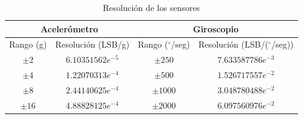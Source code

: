 \documentclass[12pt,a4paper]{article}
\newcommand{\grad}{$^{\circ}$}
\begin{document}
\begin{itemize}
		\begin{table}[H]
			\centering
			\label{table:resolucionSensor}
			\begin{tabular}{|c|c|c|c|}
				\hline
				\multicolumn{2}{|c|}{Acelerómetro} &\multicolumn{2}{|c|}{Giroscopio}   \\
				\hline
				Rango (g)        & Resolución (LSB/g)  & Rango (\grad/seg)     &  Resolución (LSB/(\grad/seg))\\ \hline
				$\pm 2$     &  $6.10351562e^{-5}$   &$\pm 250 $ 	& 	$7.633587786e^{-3}$ 	\\ 
				$\pm 4$     &  $1.22070313e^{-4}$  	&$\pm 500 $ 	& 	$1.526717557e^{-2}$    	\\
				$\pm 8$     &  $2.44140625e^{-4}$ 	& $\pm 1000$  	& 	$3.048780488e^{-2}$		\\
				$\pm 16$    &  $4.88828125e^{-4}$   & $\pm 2000$    & 	$6.097560976e^{-2}$     \\ 
				\hline
			\end{tabular}
			\caption{Resolución de los sensores}
		\end{table}
	
\end{itemize}
\end{document}
